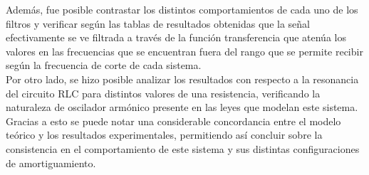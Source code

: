 \documentclass[letterpaper,11pt]{article} %
\begin{document}
Además, fue posible contrastar los distintos comportamientos de cada uno de los filtros y verificar según las tablas de resultados obtenidas que la señal efectivamente se ve filtrada a través de la función transferencia que atenúa los valores en las frecuencias que se encuentran fuera del rango que se permite recibir según la frecuencia de corte de cada sistema.\\

Por otro lado, se hizo posible analizar los resultados con respecto a la resonancia del circuito RLC para distintos valores de una resistencia, verificando la naturaleza de oscilador armónico presente en las leyes que modelan este sistema. Gracias a esto se puede notar una considerable concordancia entre el modelo teórico y los resultados experimentales, permitiendo así concluir sobre la consistencia en el comportamiento de este sistema y sus distintas configuraciones de amortiguamiento.












\end{document}
